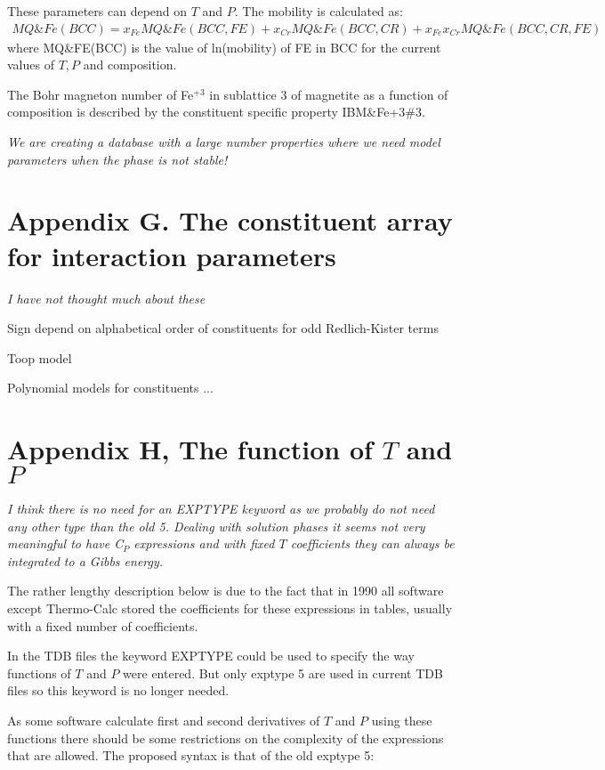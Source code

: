 \documentclass[12pt]{article}
\begin{document}
These parameters can depend on $T$ and $P$.  The mobility is
calculated as:
{\small
\begin{eqnarray}
MQ\&Fe(BCC) = x_{Fe}MQ\&Fe(BCC,FE)+x_{Cr}MQ\&Fe(BCC,CR)+x_{Fe}x_{Cr}MQ\&Fe(BCC,CR,FE)
\end{eqnarray}}
where MQ\&FE(BCC) is the value of ln(mobility) of FE in BCC for the
current values of $T, P$ and composition.

The Bohr magneton number of Fe$^{+3}$ in sublattice 3 of magnetite as
a function of composition is described by the constituent specific
property IBM\&Fe+3\#3.

{\em We are creating a database with a large number properties where we
need model parameters when the phase is not stable!}

\newpage

\section{Appendix G.  The constituent array for interaction parameters}

{\em I have not thought much about these}

Sign depend on alphabetical order of constituents for odd
Redlich-Kister terms

Toop model

Polynomial models for constituents ...

\newpage

\section{Appendix H, The function of $T$ and $P$}\label{sec:exptype}

{\em I think there is no need for an EXPTYPE keyword as we probably do
  not need any other type than the old 5.  Dealing with solution
  phases it seems not very meaningful to have C$_P$ expressions and
  with fixed $T$ coefficients they can always be integrated to a Gibbs
  energy.

  The rather lengthy description below is due to the fact that in 1990
  all software except Thermo-Calc stored the coefficients for these
  expressions in tables, usually with a fixed number of coefficients.}

In the TDB files the keyword EXPTYPE could be used to specify the way
functions of $T$ and $P$ were entered.  But only exptype 5 are used in
current TDB files so this keyword is no longer needed.

As some software calculate first and second derivatives of $T$ and $P$
using these functions there should be some restrictions on the
complexity of the expressions that are allowed.  The proposed syntax
is that of the old exptype 5:
\end{document}
